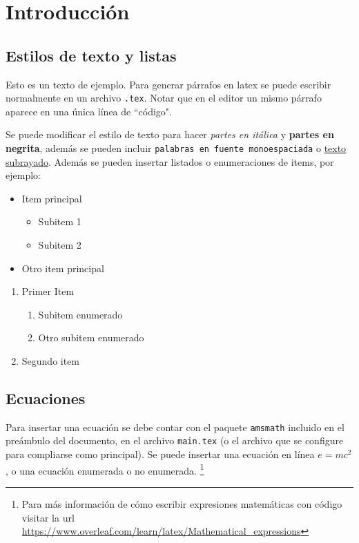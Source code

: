 \section{Introducción}

\subsection{Estilos de texto y listas}

Esto es un texto de ejemplo. Para generar párrafos en latex se puede escribir normalmente en un archivo \texttt{.tex}. Notar que en el editor un mismo párrafo aparece en una única línea de ``código".

Se puede modificar el estilo de texto para hacer \textit{partes en itálica} y \textbf{partes en negrita}, además se pueden incluir \texttt{palabras en fuente monoespaciada} o \underline{texto subrayado}. Además se pueden insertar listados o enumeraciones de items, por ejemplo:

\begin{itemize}
    \item Item principal
    \begin{itemize}
        \item Subitem 1
        \item Subitem 2
    \end{itemize}
    \item Otro item principal
\end{itemize}

\begin{enumerate}
    \item Primer Item
    \begin{enumerate}
        \item Subitem enumerado
        \item Otro subitem enumerado
    \end{enumerate}
    \item Segundo item
\end{enumerate}

\subsection{Ecuaciones}

Para insertar una ecuación se debe contar con el paquete \texttt{amsmath} incluido en el preámbulo del documento, en el archivo \texttt{main.tex} (o el archivo que se configure para compliarse como principal). Se puede insertar una ecuación en línea $e=mc^2$, o una ecuación enumerada o no enumerada. \footnote{Para más información de cómo escribir expresiones matemáticas con código visitar la url \url{https://www.overleaf.com/learn/latex/Mathematical_expressions}}

